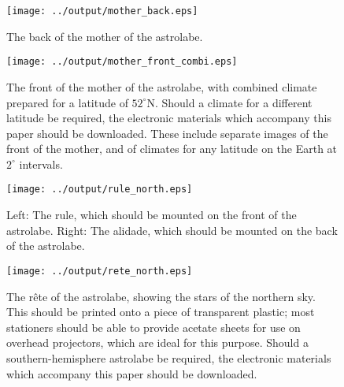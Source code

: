 \documentclass[a4paper,onecolumn,10pt]{article}
\begin{document}
\newpage

\begin{figure}
\centerline{\texttt{[image: ../output/mother\_back.eps]}}
\caption{The back of the mother of the astrolabe.}
\label{mother_back}
\end{figure}

\begin{figure}
\centerline{\texttt{[image: ../output/mother\_front\_combi.eps]}}
\caption{The front of the mother of the astrolabe, with combined climate prepared for a latitude of $52^\circ$N. Should a climate for a different latitude be required, the electronic materials which accompany this paper should be downloaded. These include separate images of the front of the mother, and of climates for any latitude on the Earth at $2^\circ$ intervals.}
\label{mother_front}
\end{figure}

\begin{figure}
\centerline{\texttt{[image: ../output/rule\_north.eps]}}
\caption{Left: The rule, which should be mounted on the front of the astrolabe. Right: The alidade, which should be mounted on the back of the astrolabe.}
\label{rule}
\end{figure}

\begin{figure}
\centerline{\texttt{[image: ../output/rete\_north.eps]}}
\caption{The r\^ete of the astrolabe, showing the stars of the northern sky. This should be printed onto a piece of transparent plastic; most stationers should be able to provide acetate sheets for use on overhead projectors, which are ideal for this purpose. Should a southern-hemisphere astrolabe be required, the electronic materials which accompany this paper should be downloaded.}
\label{rete}
\end{figure}
\end{document}
